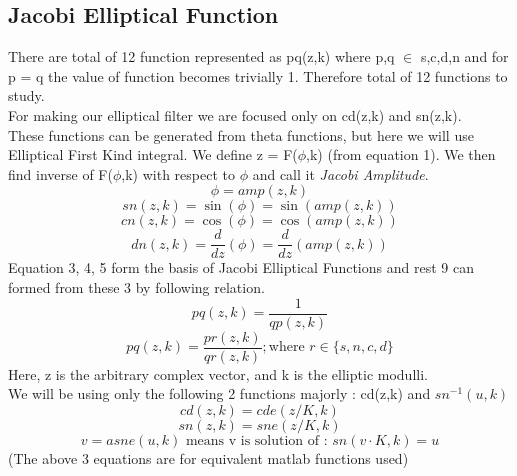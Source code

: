 \documentclass{article}
\begin{document}
\subsection{Jacobi Elliptical Function}
There are total of 12 function represented as pq(z,k) where p,q $\in$ {s,c,d,n} and for p = q the value of function becomes trivially 1. Therefore total of 12 functions to study.\\
For making our elliptical filter we are focused only on cd(z,k) and sn(z,k).\\
These functions can be generated from theta functions, but here we will use Elliptical First Kind integral. We define z = F($\phi$,k) (from equation 1). We then find inverse of F($\phi$,k) with respect to $\phi$ and call it \textit{Jacobi Amplitude}.
\begin{equation*}
    \phi = amp(z,k)
\end{equation*}
\begin{equation}
    sn(z,k) = \sin(\phi) = \sin(amp(z,k))
\end{equation}
\begin{equation}
    cn(z,k) = \cos(\phi) = \cos(amp(z,k))
\end{equation}
\begin{equation}
    dn(z,k) = \frac{d}{dz}(\phi) = \frac{d}{dz}(amp(z,k))
\end{equation}
Equation 3, 4, 5 form the basis of Jacobi Elliptical Functions and rest 9 can formed from these 3 by following relation.
\begin{equation*}
    pq(z,k) = \frac{1}{qp(z,k)}
\end{equation*}
\begin{equation*}
    pq(z,k) = \frac{pr(z,k)}{qr(z,k)}; \text{where }r \in \{s,n,c,d\}
\end{equation*}
Here,  z is the arbitrary complex vector, and k is the elliptic modulli.\\
We will be using only the following 2 functions majorly : cd(z,k) and $sn^{-1}(u,k)$\\

\begin{equation*}
    cd(z,k) = cde(z/K,k)
\end{equation*}
\begin{equation*}
    sn(z,k) = sne(z/K,k)
\end{equation*}
\begin{equation*}
    v = asne(u,k) \text{ means v is solution of : } sn(v\cdot K,k) = u
\end{equation*}
(The above 3 equations are for equivalent matlab functions used)
\end{document}
